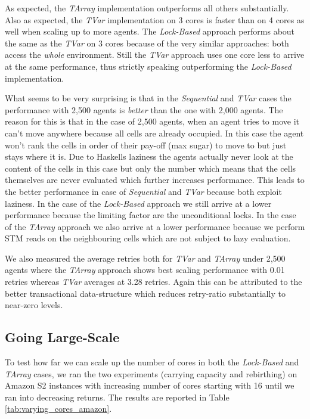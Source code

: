 As expected, the \textit{TArray} implementation outperforms all others substantially. Also as expected, the \textit{TVar} implementation on 3 cores is faster than on 4 cores as well when scaling up to more agents. The \textit{Lock-Based} approach performs about the same as the \textit{TVar} on 3 cores because of the very similar approaches: both access the \textit{whole} environment. Still the \textit{TVar} approach uses one core less to arrive at the same performance, thus strictly speaking outperforming the \textit{Lock-Based} implementation.

What seems to be very surprising is that in the \textit{Sequential} and \textit{TVar} cases the performance with 2,500 agents is \textit{better} than the one with 2,000 agents. The reason for this is that in the case of 2,500 agents, when an agent tries to move it can't move anywhere because all cells are already occupied. In this case the agent won't rank the cells in order of their pay-off (max sugar) to move to but just stays where it is.  Due to Haskells laziness the agents actually never look at the content of the cells in this case but only the number which means that the cells themselves are never evaluated which further increases performance. This leads to the better performance in case of \textit{Sequential} and \textit{TVar} because both exploit laziness.
In the case of the \textit{Lock-Based} approach we still arrive at a lower performance because the limiting factor are the unconditional locks. In the case of the \textit{TArray} approach we also arrive at a lower performance because we perform STM reads on the neighbouring cells which are not subject to lazy evaluation.

We also measured the average retries both for \textit{TVar} and \textit{TArray} under 2,500 agents where the \textit{TArray} approach shows best scaling performance with 0.01 retries whereas \textit{TVar} averages at 3.28 retries. Again this can be attributed to the better transactional data-structure which reduces retry-ratio substantially to near-zero levels.

\subsection{Going Large-Scale}
To test how far we can scale up the number of cores in both the \textit{Lock-Based} and \textit{TArray} cases, we ran the two experiments (carrying capacity and rebirthing) on Amazon S2 instances with increasing number of cores starting with 16 until we ran into decreasing returns. The results are reported in Table \ref{tab:varying_cores_amazon}.

